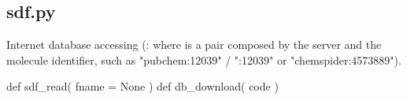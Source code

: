 \normalsize
\subsection[sdf]{sdf.py}
Internet database accessing (: where  is a pair composed by the server and the molecule
identifier, such as "pubchem:12039" / ":12039" or "chemspider:4573889").
\begin{pyglist}[language=python,fvset={frame=single}]
def sdf_read( fname = None )
def db_download( code )
\end{pyglist}
